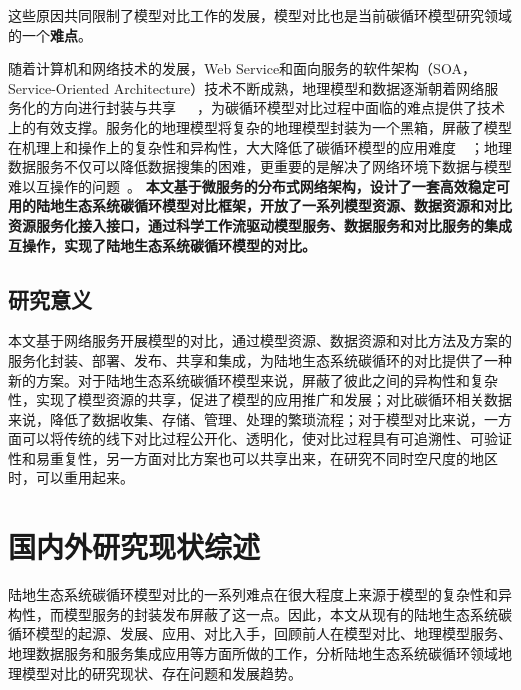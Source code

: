 这些原因共同限制了模型对比工作的发展，模型对比也是当前碳循环模型研究领域的一个\textbf{难点}。

随着计算机和网络技术的发展，Web Service和面向服务的软件架构（SOA，Service-Oriented Architecture）技术不断成熟，地理模型和数据逐渐朝着网络服务化的方向进行封装与共享~\cite{adgeo-4-69-2005}~\cite{peckham2009componentizing}~\cite{胡迪2015地理模型的服务化封装方法研究}，为碳循环模型对比过程中面临的难点提供了技术上的有效支撑。服务化的地理模型将复杂的地理模型封装为一个黑箱，屏蔽了模型在机理上和操作上的复杂性和异构性，大大降低了碳循环模型的应用难度~\cite{胡迪2015地理模型的服务化封装方法研究}~\cite{yue2016service}；地理数据服务不仅可以降低数据搜集的困难，更重要的是解决了网络环境下数据与模型难以互操作的问题~\cite{Yue2015A}。
\textbf{本文基于微服务的分布式网络架构，设计了一套高效稳定可用的陆地生态系统碳循环模型对比框架，开放了一系列模型资源、数据资源和对比资源服务化接入接口，通过科学工作流驱动模型服务、数据服务和对比服务的集成互操作，实现了陆地生态系统碳循环模型的对比。}

\subsection{研究意义}

本文基于网络服务开展模型的对比，通过模型资源、数据资源和对比方法及方案的服务化封装、部署、发布、共享和集成，为陆地生态系统碳循环的对比提供了一种新的方案。对于陆地生态系统碳循环模型来说，屏蔽了彼此之间的异构性和复杂性，实现了模型资源的共享，促进了模型的应用推广和发展；对比碳循环相关数据来说，降低了数据收集、存储、管理、处理的繁琐流程；对于模型对比来说，一方面可以将传统的线下对比过程公开化、透明化，使对比过程具有可追溯性、可验证性和易重复性，另一方面对比方案也可以共享出来，在研究不同时空尺度的地区时，可以重用起来。

\section{国内外研究现状综述}
陆地生态系统碳循环模型对比的一系列难点在很大程度上来源于模型的复杂性和异构性，而模型服务的封装发布屏蔽了这一点。因此，本文从现有的陆地生态系统碳循环模型的起源、发展、应用、对比入手，回顾前人在模型对比、地理模型服务、地理数据服务和服务集成应用等方面所做的工作，分析陆地生态系统碳循环领域地理模型对比的研究现状、存在问题和发展趋势。

